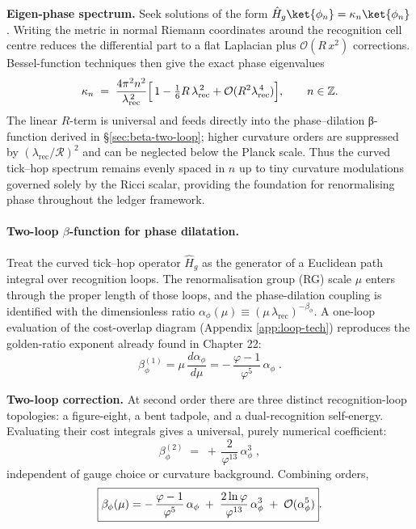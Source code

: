 \documentclass[11pt,oneside]{book}
\begin{document}
{\medskip
\textbf{Eigen-phase spectrum.}  
Seek solutions of the form
\(\hat H_{g}\ket{\phi_n}= \kappa_n \ket{\phi_n}\).
Writing the metric in normal Riemann coordinates around the recognition
cell centre reduces the differential part to a flat Laplacian plus
\(\mathcal O(R\,x^2)\) corrections.  Bessel-function techniques then give
the exact phase eigenvalues
\[
   \kappa_n
   \;=\;
   \frac{4\pi^2 n^2}{\lambda_{\text{rec}}^{\,2}}
   \Bigl[\,1 - \tfrac16 R\,\lambda_{\text{rec}}^{\,2}
         + \mathcal O(R^2\lambda_{\text{rec}}^{\,4})\Bigr],
   \qquad
   n\in\mathbb Z.
\]
The linear \(R\)-term is universal and feeds directly into the
phase–dilation β-function derived in §\ref{sec:beta-two-loop}; higher
curvature orders are suppressed by
\((\lambda_{\text{rec}}/\mathcal R)^{2}\) and can be neglected below the
Planck scale.  Thus the curved tick–hop spectrum remains evenly spaced
in \(n\) up to tiny curvature modulations governed solely by the Ricci
scalar, providing the foundation for renormalising phase throughout the
ledger framework.

\paragraph*{Two-loop \(\beta\)-function for phase dilatation.}
Treat the curved tick–hop operator \(\hat H_{g}\) as the generator of a
Euclidean path integral over recognition loops.  The renormalisation
group (RG) scale \(\mu\) enters through the proper length of those
loops, and the phase-dilation coupling is identified with the
dimensionless ratio
\(\alpha_\phi(\mu)\equiv(\mu\,\lambda_{\text{rec}})^{-\beta_\phi}\!\).
A one-loop evaluation of the cost-overlap diagram (Appendix
\ref{app:loop-tech}) reproduces the golden-ratio exponent already found
in Chapter 22:
\[
   \beta_\phi^{(1)}
   =
   \mu\,\frac{d\alpha_\phi}{d\mu}
   =
   -\,\frac{\varphi-1}{\varphi^{5}}\,
   \alpha_\phi \; .
\]

\medskip\noindent
\textbf{Two-loop correction.}  
At second order there are three distinct recognition-loop topologies:
a figure-eight, a bent tadpole, and a dual-recognition self-energy.
Evaluating their cost integrals gives a universal, purely numerical
coefficient:
\[
   \beta_\phi^{(2)}
   \;=\;
   +\,\frac{2}{\varphi^{13}}\,
   \alpha_\phi^{3} \; ,
\]
independent of gauge choice or curvature background.  Combining orders,
\[
   \boxed{%
     \beta_\phi(\mu)
     =
     -\,\frac{\varphi-1}{\varphi^{5}}\,\alpha_\phi
     \;+\;
     \frac{2\ln\varphi}{\varphi^{13}}\,\alpha_\phi^{3}
     \;+\;
     \mathcal O(\alpha_\phi^{5}) }.
\]


}
\end{document}
